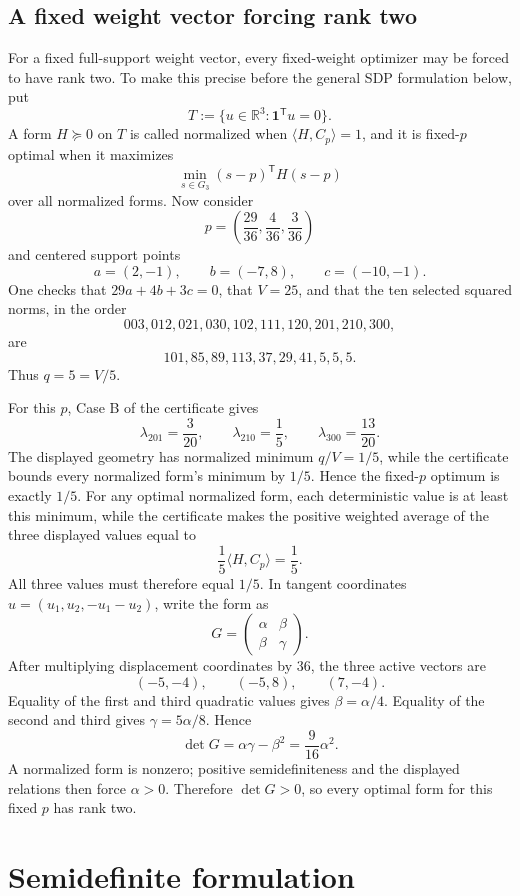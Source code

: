\documentclass[11pt]{article}
\theoremstyle{definition}
\theoremstyle{remark}
\newcommand{\R}{\mathbb{R}}
\newcommand{\one}{\mathbf{1}}
\begin{document}
\subsection{A fixed weight vector forcing rank two}

For a fixed full-support weight vector, every fixed-weight optimizer may be forced to have rank two.  To make this precise before the general SDP formulation below, put
\[
T:=\{u\in\R^3:\one^{\mathsf T}u=0\}.
\]
A form $H\succeq0$ on $T$ is called normalized when $\langle H,C_p\rangle=1$, and it is fixed-$p$ optimal when it maximizes
\[
\min_{s\in G_3}(s-p)^{\mathsf T}H(s-p)
\]
over all normalized forms.  Now consider
\[
p=\left(\frac{29}{36},\frac4{36},\frac3{36}\right)
\]
and centered support points
\[
a=(2,-1),\qquad b=(-7,8),\qquad c=(-10,-1).
\]
One checks that $29a+4b+3c=0$, that $V=25$, and that the ten selected squared norms, in the order
\[
003,012,021,030,102,111,120,201,210,300,
\]
are
\[
101,85,89,113,37,29,41,5,5,5.
\]
Thus $q=5=V/5$.

For this $p$, Case B of the certificate gives
\[
\lambda_{201}=\frac3{20},\qquad
\lambda_{210}=\frac15,\qquad
\lambda_{300}=\frac{13}{20}.
\]
The displayed geometry has normalized minimum $q/V=1/5$, while the certificate bounds every normalized form's minimum by $1/5$.  Hence the fixed-$p$ optimum is exactly $1/5$.  For any optimal normalized form, each deterministic value is at least this minimum, while the certificate makes the positive weighted average of the three displayed values equal to
\[
\frac15\langle H,C_p\rangle=\frac15.
\]
All three values must therefore equal $1/5$.  In tangent coordinates $u=(u_1,u_2,-u_1-u_2)$, write the form as
\[
G=\begin{pmatrix}\alpha&\beta\\\beta&\gamma\end{pmatrix}.
\]
After multiplying displacement coordinates by $36$, the three active vectors are
\[
(-5,-4),\qquad(-5,8),\qquad(7,-4).
\]
Equality of the first and third quadratic values gives $\beta=\alpha/4$.  Equality of the second and third gives $\gamma=5\alpha/8$.  Hence
\[
\det G=\alpha\gamma-\beta^2
=\frac9{16}\alpha^2.
\]
A normalized form is nonzero; positive semidefiniteness and the displayed relations then force $\alpha>0$.  Therefore $\det G>0$, so every optimal form for this fixed $p$ has rank two.

\section{Semidefinite formulation}
\end{document}
